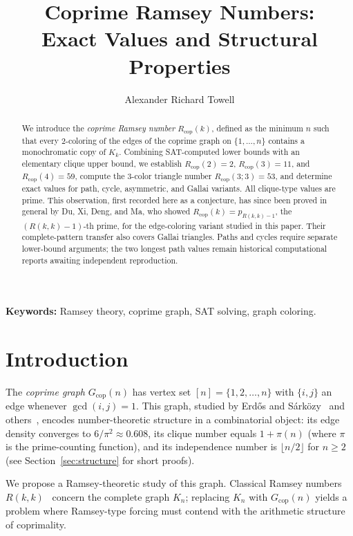\documentclass[12pt]{article}
\title{Coprime Ramsey Numbers:\\
Exact Values and Structural Properties}
\author{Alexander Richard Towell\authornote{1}}
\newcommand{\Rcop}{R_{\mathrm{cop}}}
\newcommand{\Gcop}{G_{\mathrm{cop}}}
\begin{document}
\maketitle

\begin{abstract}
We introduce the \emph{coprime Ramsey number} $\Rcop(k)$, defined as
the minimum $n$ such that every $2$-coloring of the edges of the coprime
graph on $\{1,\ldots,n\}$ contains a monochromatic copy of
$K_k$. Combining SAT-computed lower bounds with an elementary clique
upper bound, we establish $\Rcop(2)=2$, $\Rcop(3)=11$, and
$\Rcop(4)=59$, compute the $3$-color triangle number
$\Rcop(3;3)=53$, and determine exact values for path, cycle,
asymmetric, and Gallai variants. All clique-type values are prime.
This observation, first recorded here as a conjecture, has since been
proved in general by Du, Xi, Deng, and Ma, who showed
$\Rcop(k)=p_{R(k,k)-1}$, the $(R(k,k)-1)$-th prime, for the
edge-coloring variant studied in this paper. Their complete-pattern
transfer also covers Gallai triangles. Paths and cycles require separate
lower-bound arguments; the two longest path values remain historical
computational reports awaiting independent reproduction.
\end{abstract}

\smallskip\noindent\textbf{Keywords:} Ramsey theory, coprime graph,
SAT solving, graph coloring.

\section{Introduction}\label{sec:intro}

The \emph{coprime graph} $\Gcop(n)$ has vertex set
$[n]=\{1,2,\ldots,n\}$ with $\{i,j\}$ an edge whenever
$\gcd(i,j)=1$. This graph, studied by Erd\H{o}s and
S\'ark\"ozy~\cite{erdos1997coprime} and others~\cite{pomerance2015,
ahlswede1993}, encodes number-theoretic structure in a combinatorial
object: its edge density converges to $6/\pi^2\approx 0.608$, its
clique number equals $1+\pi(n)$ (where $\pi$ is the prime-counting
function), and its independence number is $\lfloor n/2\rfloor$ for
$n \ge 2$ (see Section~\ref{sec:structure} for short proofs).

We propose a Ramsey-theoretic study of this graph. Classical Ramsey
numbers $R(k,k)$~\cite{ramsey1930} concern the complete graph $K_n$;
replacing $K_n$ with
$\Gcop(n)$ yields a problem where Ramsey-type forcing must contend with
the arithmetic structure of coprimality.
\end{document}
